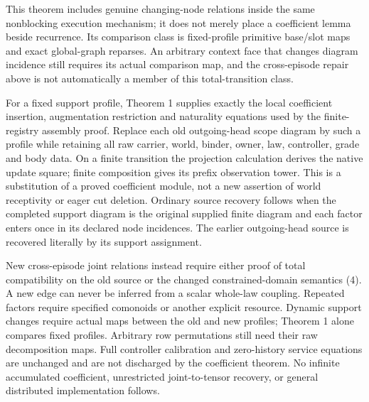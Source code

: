 \documentclass[11pt]{article}
\begin{document}
This theorem includes genuine changing-node relations inside the same nonblocking execution mechanism; it does not merely place a coefficient lemma beside recurrence. Its comparison class is fixed-profile primitive base/slot maps and exact global-graph reparses. An arbitrary context face that changes diagram incidence still requires its actual comparison map, and the cross-episode repair above is not automatically a member of this total-transition class.

For a fixed support profile, Theorem 1 supplies exactly the local coefficient insertion, augmentation restriction and naturality equations used by the finite-registry assembly proof. Replace each old outgoing-head scope diagram by such a profile while retaining all raw carrier, world, binder, owner, law, controller, grade and body data. On a finite transition the projection calculation derives the native update square; finite composition gives its prefix observation tower. This is a substitution of a proved coefficient module, not a new assertion of world receptivity or eager cut deletion. Ordinary source recovery follows when the completed support diagram is the original supplied finite diagram and each factor enters once in its declared node incidences. The earlier outgoing-head source is recovered literally by its support assignment.

New cross-episode joint relations instead require either proof of total compatibility on the old source or the changed constrained-domain semantics (4). A new edge can never be inferred from a scalar whole-law coupling. Repeated factors require specified comonoids or another explicit resource. Dynamic support changes require actual maps between the old and new profiles; Theorem 1 alone compares fixed profiles. Arbitrary row permutations still need their raw decomposition maps. Full controller calibration and zero-history service equations are unchanged and are not discharged by the coefficient theorem. No infinite accumulated coefficient, unrestricted joint-to-tensor recovery, or general distributed implementation follows.
\end{document}
